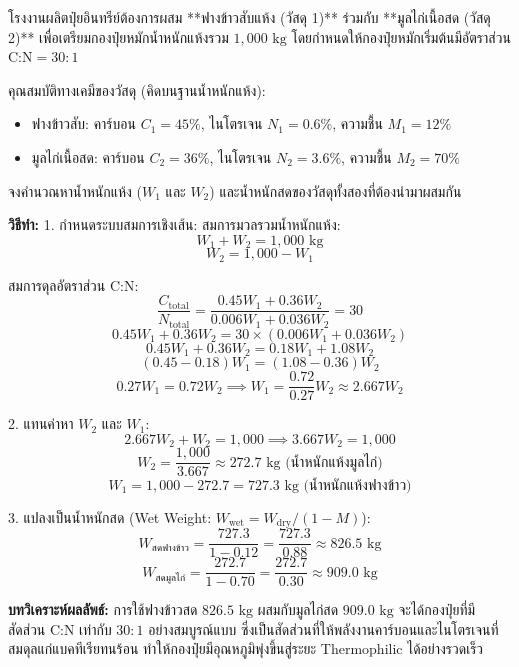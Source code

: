 \begin{worked}
โรงงานผลิตปุ๋ยอินทรีย์ต้องการผสม **ฟางข้าวสับแห้ง (วัสดุ 1)** ร่วมกับ **มูลไก่เนื้อสด (วัสดุ 2)** เพื่อเตรียมกองปุ๋ยหมักน้ำหนักแห้งรวม $1,000\text{ kg}$ โดยกำหนดให้กองปุ๋ยหมักเริ่มต้นมีอัตราส่วน $\text{C:N} = 30:1$ 

คุณสมบัติทางเคมีของวัสดุ (คิดบนฐานน้ำหนักแห้ง):
\begin{itemize}
    \item ฟางข้าวสับ: คาร์บอน $C_1 = 45\%$, ไนโตรเจน $N_1 = 0.6\%$, ความชื้น $M_1 = 12\%$
    \item มูลไก่เนื้อสด: คาร์บอน $C_2 = 36\%$, ไนโตรเจน $N_2 = 3.6\%$, ความชื้น $M_2 = 70\%$
\end{itemize}
จงคำนวณหาน้ำหนักแห้ง ($W_1$ และ $W_2$) และน้ำหนักสดของวัสดุทั้งสองที่ต้องนำมาผสมกัน

\textbf{วิธีทำ:}
1. กำหนดระบบสมการเชิงเส้น:
สมการมวลรวมน้ำหนักแห้ง:
$$W_1 + W_2 = 1,000\text{ kg}$$
$$W_2 = 1,000 - W_1$$

สมการดุลอัตราส่วน C:N:
$$\frac{C_{\text{total}}}{N_{\text{total}}} = \frac{0.45 W_1 + 0.36 W_2}{0.006 W_1 + 0.036 W_2} = 30$$
$$0.45 W_1 + 0.36 W_2 = 30 \times (0.006 W_1 + 0.036 W_2)$$
$$0.45 W_1 + 0.36 W_2 = 0.18 W_1 + 1.08 W_2$$
$$(0.45 - 0.18) W_1 = (1.08 - 0.36) W_2$$
$$0.27 W_1 = 0.72 W_2 \implies W_1 = \frac{0.72}{0.27} W_2 \approx 2.667 W_2$$

2. แทนค่าหา $W_2$ และ $W_1$:
$$2.667 W_2 + W_2 = 1,000 \implies 3.667 W_2 = 1,000$$
$$W_2 = \frac{1,000}{3.667} \approx 272.7\text{ kg (น้ำหนักแห้งมูลไก่)}$$
$$W_1 = 1,000 - 272.7 = 727.3\text{ kg (น้ำหนักแห้งฟางข้าว)}$$

3. แปลงเป็นน้ำหนักสด (Wet Weight: $W_{\text{wet}} = W_{\text{dry}} / (1 - M)$):
$$W_{\text{สดฟางข้าว}} = \frac{727.3}{1 - 0.12} = \frac{727.3}{0.88} \approx 826.5\text{ kg}$$
$$W_{\text{สดมูลไก่}} = \frac{272.7}{1 - 0.70} = \frac{272.7}{0.30} \approx 909.0\text{ kg}$$

\textbf{บทวิเคราะห์ผลลัพธ์:} การใช้ฟางข้าวสด $826.5\text{ kg}$ ผสมกับมูลไก่สด $909.0\text{ kg}$ จะได้กองปุ๋ยที่มีสัดส่วน C:N เท่ากับ $30:1$ อย่างสมบูรณ์แบบ ซึ่งเป็นสัดส่วนที่ให้พลังงานคาร์บอนและไนโตรเจนที่สมดุลแก่แบคทีเรียทนร้อน ทำให้กองปุ๋ยมีอุณหภูมิพุ่งขึ้นสู่ระยะ Thermophilic ได้อย่างรวดเร็ว
\end{worked}

